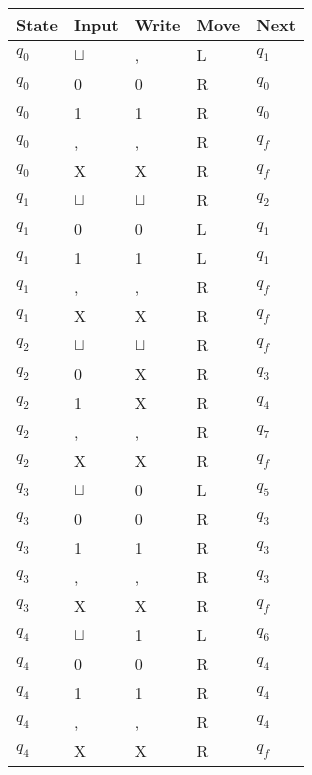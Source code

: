 \documentclass[a4paper, hidelinks, twocolumn, 9pt]{article}
\newcommand{\blm}{\sqcup}
\newcommand{\bl}{\(\blm\)}
\begin{document}
  \begin{center}
    \begin{tabular}{x{1cm}x{1cm}x{1cm}x{1cm}x{1cm}}
      \toprule
      State & Input & Write & Move & Next \\
      \midrule
      \(q_0\) & \bl &   , & L & \(q_1\) \\
      \(q_0\) &   0 &   0 & R & \(q_0\) \\
      \(q_0\) &   1 &   1 & R & \(q_0\) \\
      \(q_0\) &   , &   , & R & \(q_f\) \\
      \(q_0\) &   X &   X & R & \(q_f\) \\
      \midrule
      \(q_1\) & \bl & \bl & R & \(q_2\) \\
      \(q_1\) &   0 &   0 & L & \(q_1\) \\
      \(q_1\) &   1 &   1 & L & \(q_1\) \\
      \(q_1\) &   , &   , & R & \(q_f\) \\
      \(q_1\) &   X &   X & R & \(q_f\) \\
      \midrule
      \(q_2\) & \bl & \bl & R & \(q_f\) \\
      \(q_2\) &   0 &   X & R & \(q_3\) \\
      \(q_2\) &   1 &   X & R & \(q_4\) \\
      \(q_2\) &   , &   , & R & \(q_7\) \\
      \(q_2\) &   X &   X & R & \(q_f\) \\
      \midrule
      \(q_3\) & \bl &   0 & L & \(q_5\) \\
      \(q_3\) &   0 &   0 & R & \(q_3\) \\
      \(q_3\) &   1 &   1 & R & \(q_3\) \\
      \(q_3\) &   , &   , & R & \(q_3\) \\
      \(q_3\) &   X &   X & R & \(q_f\) \\
      \midrule
      \(q_4\) & \bl &   1 & L & \(q_6\) \\
      \(q_4\) &   0 &   0 & R & \(q_4\) \\
      \(q_4\) &   1 &   1 & R & \(q_4\) \\
      \(q_4\) &   , &   , & R & \(q_4\) \\
      \(q_4\) &   X &   X & R & \(q_f\) \\
      \midrule

\end{tabular}
\end{center}
\end{document}
